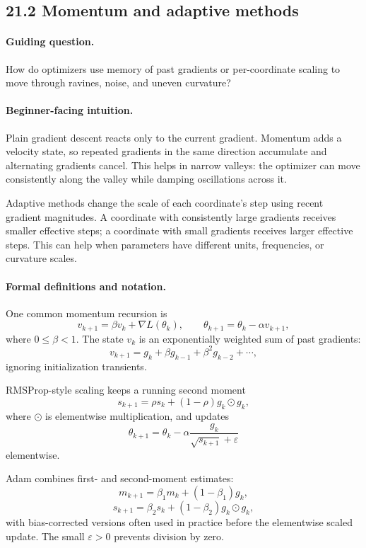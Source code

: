 \subsection{21.2 Momentum and adaptive methods}

\paragraph{Guiding question.}
How do optimizers use memory of past gradients or per-coordinate scaling to move through ravines, noise, and uneven curvature?

\paragraph{Beginner-facing intuition.}
Plain gradient descent reacts only to the current gradient. Momentum adds a velocity state, so repeated gradients in the same direction accumulate and alternating gradients cancel. This helps in narrow valleys: the optimizer can move consistently along the valley while damping oscillations across it.

Adaptive methods change the scale of each coordinate's step using recent gradient magnitudes. A coordinate with consistently large gradients receives smaller effective steps; a coordinate with small gradients receives larger effective steps. This can help when parameters have different units, frequencies, or curvature scales.

\paragraph{Formal definitions and notation.}
One common momentum recursion is
\[
v_{k+1}=\beta v_k+\nabla L(\theta_k),
\qquad
\theta_{k+1}=\theta_k-\alpha v_{k+1},
\]
where \(0\le \beta<1\). The state \(v_k\) is an exponentially weighted sum of past gradients:
\[
v_{k+1}=g_k+\beta g_{k-1}+\beta^2 g_{k-2}+\cdots,
\]
ignoring initialization transients.

RMSProp-style scaling keeps a running second moment
\[
s_{k+1}=\rho s_k+(1-\rho)g_k\odot g_k,
\]
where \(\odot\) is elementwise multiplication, and updates
\[
\theta_{k+1}
=\theta_k-\alpha\frac{g_k}{\sqrt{s_{k+1}}+\varepsilon}
\]
elementwise.

Adam combines first- and second-moment estimates:
\[
m_{k+1}=\beta_1m_k+(1-\beta_1)g_k,
\]
\[
s_{k+1}=\beta_2s_k+(1-\beta_2)g_k\odot g_k,
\]
with bias-corrected versions often used in practice before the elementwise scaled update. The small \(\varepsilon>0\) prevents division by zero.

